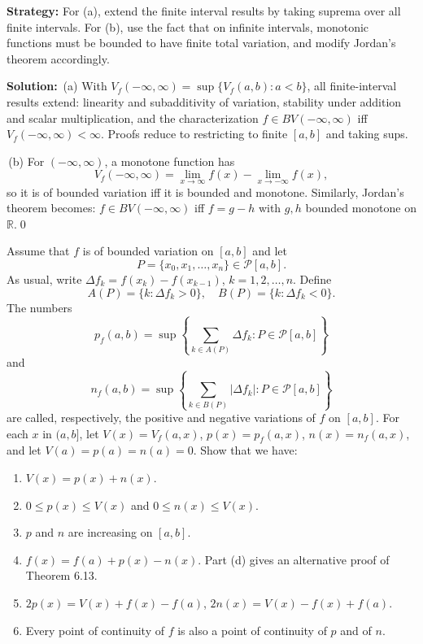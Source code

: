 \noindent\textbf{Strategy:} For (a), extend the finite interval results by taking suprema over all finite intervals. For (b), use the fact that on infinite intervals, monotonic functions must be bounded to have finite total variation, and modify Jordan's theorem accordingly.

\bigskip\noindent\textbf{Solution:}
\,(a) With $V_f(-\infty,\infty)=\sup\{V_f(a,b): a<b\}$, all finite-interval results extend: linearity and subadditivity of variation, stability under addition and scalar multiplication, and the characterization $f\in BV(-\infty,\infty)$ iff $V_f(-\infty,\infty)<\infty$. Proofs reduce to restricting to finite $[a,b]$ and taking sups.

\,(b) For $(-\infty,\infty)$, a monotone function has
\[V_f(-\infty,\infty)=\lim_{x\to\infty}f(x)-\lim_{x\to-\infty}f(x),\]
so it is of bounded variation iff it is bounded and monotone. Similarly, Jordan’s theorem becomes: $f\in BV(-\infty,\infty)$ iff $f=g-h$ with $g,h$ bounded monotone on $\mathbb{R}$.\qed


\begin{problembox}
\begin{problemstatement}
Assume that $f$ is of bounded variation on $[a, b]$ and let
\[P = \{x_0, x_1, \ldots, x_n\} \in \mathcal{P}[a, b].\]
As usual, write $\Delta f_k = f(x_k) - f(x_{k-1})$, $k = 1, 2, \ldots, n$. Define
\[A(P) = \{k : \Delta f_k > 0\}, \quad B(P) = \{k : \Delta f_k < 0\}.\]
The numbers
\[p_f(a, b) = \sup \left\{ \sum_{k \in A(P)} \Delta f_k : P \in \mathcal{P}[a, b] \right\}\]
and
\[n_f(a, b) = \sup \left\{ \sum_{k \in B(P)} |\Delta f_k| : P \in \mathcal{P}[a, b] \right\}\]
are called, respectively, the positive and negative variations of $f$ on $[a, b]$. For each $x$ in $(a, b]$, let $V(x) = V_f(a, x)$, $p(x) = p_f(a, x)$, $n(x) = n_f(a, x)$, and let $V(a) = p(a) = n(a) = 0$. Show that we have:
\begin{enumerate}[label=\alph*)]
\item $V(x) = p(x) + n(x)$.
\item $0 \leq p(x) \leq V(x)$ and $0 \leq n(x) \leq V(x)$.
\item $p$ and $n$ are increasing on $[a, b]$.
\item $f(x) = f(a) + p(x) - n(x)$. Part (d) gives an alternative proof of Theorem 6.13.
\item $2p(x) = V(x) + f(x) - f(a)$, $2n(x) = V(x) - f(x) + f(a)$.
\item Every point of continuity of $f$ is also a point of continuity of $p$ and of $n$.
\end{enumerate}
\end{problemstatement}
\end{problembox}

